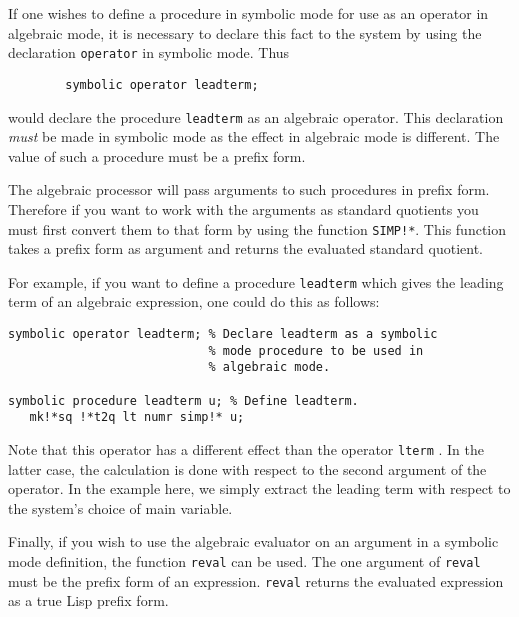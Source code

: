 If one wishes to define a procedure in symbolic mode for use as an
operator in algebraic mode, it is necessary to declare this fact to the
system by using the declaration \texttt{operator} in
symbolic mode. Thus
\begin{verbatim}
        symbolic operator leadterm;
\end{verbatim}
would declare the procedure \texttt{leadterm} as an algebraic operator. This
declaration \emph{must} be made in symbolic mode as the effect in algebraic
mode is different.  The value of such a procedure must be a prefix form.

The algebraic processor will pass arguments to such procedures in prefix
form. Therefore if you want to work with the arguments as standard
quotients you must first convert them to that form by using the function
\texttt{SIMP!*}. This function takes a prefix form as argument and returns the
evaluated standard quotient.

For example, if you want to define a procedure \texttt{leadterm} which gives the
leading term of an algebraic expression, one could do this as follows:
\begin{samepage}
\begin{verbatim}
symbolic operator leadterm; % Declare leadterm as a symbolic
                            % mode procedure to be used in
                            % algebraic mode.

symbolic procedure leadterm u; % Define leadterm.
   mk!*sq !*t2q lt numr simp!* u;
\end{verbatim}
\end{samepage}
Note that this operator has a different effect than the operator \texttt{lterm}
.  In the latter case, the calculation is done
with respect to the second argument of the operator.  In the example here,
we simply extract the leading term with respect to the system's choice of
main variable.

Finally, if you wish to use the algebraic evaluator on an argument in a
symbolic mode definition, the function \texttt{reval} can be used.  The one
argument of \texttt{reval} must be the prefix form of an expression.
\texttt{reval} returns the evaluated expression as a true Lisp prefix form.

